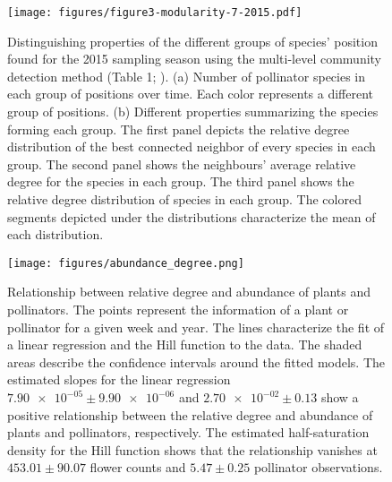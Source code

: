 \documentclass[11pt, a4paper]{article}
\begin{document}
\begin{figure}[p]
  \centering
    \vspace{0.5cm}
    \texttt{[image: figures/figure3-modularity-7-2015.pdf]}
	  \vspace{0.3cm}
	   \caption[Distinguishing properties of the different groups of species' position found for the 2015 sampling season using the multi-level community detection method]{Distinguishing properties of the different groups of species' position found for the 2015 sampling season using the multi-level community detection method (Table 1; \citealt{blondel2008fast}). (a) Number of pollinator species in each group of positions over time. Each color represents a different group of positions. (b) Different properties summarizing the species forming each group. The first panel depicts the relative degree distribution of the best connected neighbor of every species in each group. The second panel shows the neighbours' average relative degree for the species in each group. The third panel shows the relative degree distribution of species in each group. The colored segments depicted under the distributions characterize the mean of each distribution.}
      \label{sfig:groups2015-modularity7}
\end{figure}

\clearpage

\begin{figure}[ht]
  \centering
    \vspace{0.5cm}
    \texttt{[image: figures/abundance\_degree.png]}
	   \caption{Relationship between relative degree and abundance of plants and pollinators. The points represent the information of a plant or pollinator for a given week and year. The lines characterize the fit of a linear regression and the Hill function to the data. The shaded areas describe the confidence intervals around the fitted models. The estimated slopes for the linear regression $\num{7.90e-05}\pm \num{9.90e-06}$ and $\num{2.70e-02}\pm \num{0.13}$ show a positive relationship between the relative degree and abundance of plants and pollinators, respectively. The estimated half-saturation density for the Hill function shows that the relationship vanishes at $453.01\pm 90.07$ flower counts and $5.47\pm 0.25$ pollinator observations.}

      \label{sfig:abundance}
\end{figure}

\clearpage
\end{document}
